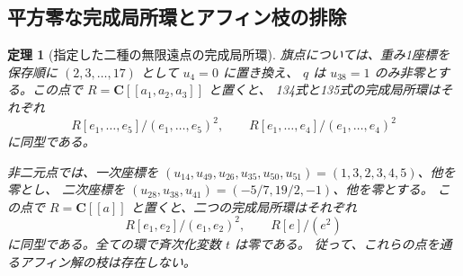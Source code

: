 \documentclass[11pt,a4paper]{ltjsarticle}
\newcommand{\CC}{\mathbf C}
\newtheorem{theorem}{定理}[section]
\theoremstyle{remark}
\begin{document}
\subsection{平方零な完成局所環とアフィン枝の排除}
\begin{theorem}[指定した二種の無限遠点の完成局所環]
旗点については、重み1座標を保存順に $(2,3,\ldots,17)$ として $u_4=0$ に置き換え、
$q$ は $u_{38}=1$ のみ非零とする。この点で $R=\CC[[a_1,a_2,a_3]]$ と置くと、
134式と135式の完成局所環はそれぞれ
\[
 R[e_1,\ldots,e_5]/(e_1,\ldots,e_5)^2,\qquad
 R[e_1,\ldots,e_4]/(e_1,\ldots,e_4)^2
\]
に同型である。

非二元点では、一次座標を
$(u_{14},u_{49},u_{26},u_{35},u_{50},u_{51})=(1,3,2,3,4,5)$、他を零とし、
二次座標を $(u_{28},u_{38},u_{41})=(-5/7,19/2,-1)$、他を零とする。
この点で $R=\CC[[a]]$ と置くと、二つの完成局所環はそれぞれ
\[
 R[e_1,e_2]/(e_1,e_2)^2,\qquad R[e]/(e^2)
\]
に同型である。全ての環で斉次化変数 $t$ は零である。
従って、これらの点を通るアフィン解の枝は存在しない。
\end{theorem}
\end{document}
